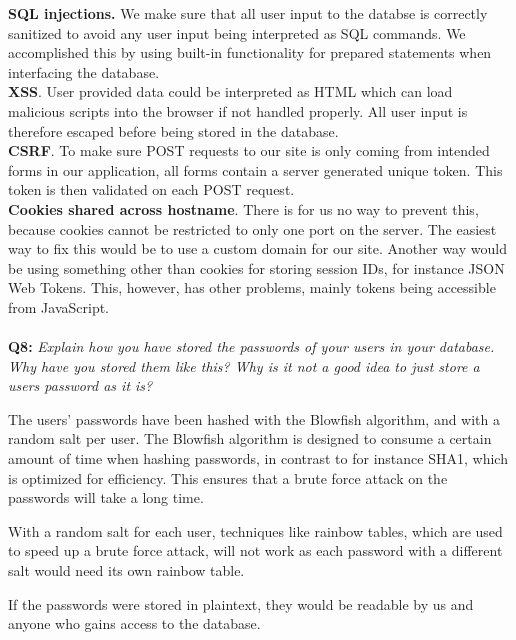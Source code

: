 \textbf{SQL injections.} We make sure that all user input to the databse is correctly sanitized to avoid any user input being interpreted as SQL commands.
We accomplished this by using built-in functionality for prepared statements when interfacing the database. \\
\textbf{XSS}. User provided data could be interpreted as HTML which can load malicious scripts into the browser if not handled properly.
All user input is therefore escaped before being stored in the database. \\
\textbf{CSRF}. To make sure POST requests to our site is only coming from intended forms in our application, all forms contain a server generated unique token.
This token is then validated on each POST request. \\
\textbf{Cookies shared across hostname}. There is for us no way to prevent this, because cookies cannot be restricted to only one port on the server.
The easiest way to fix this would be to use a custom domain for our site.
Another way would be using something other than cookies for storing session IDs, for instance JSON Web Tokens.
This, however, has other problems, mainly tokens being accessible from JavaScript.

\paragraph{}
\textbf{Q8:}
\textit{Explain how you have stored the passwords of your users in your database. Why have you stored them like this? Why is it not a good idea to just store a users password as it is?}

The users' passwords have been hashed with the Blowfish\cite{blowfish} algorithm, and with a random salt per user.
The Blowfish algorithm is designed to consume a certain amount of time when hashing passwords, in contrast to for instance SHA1, which is optimized for efficiency.
This ensures that a brute force attack on the passwords will take a long time.

With a random salt for each user, techniques like rainbow tables, which are used to speed up a brute force attack, will not work as each password with a different salt would need its own rainbow table.

If the passwords were stored in plaintext, they would be readable by us and anyone who gains access to the database.

